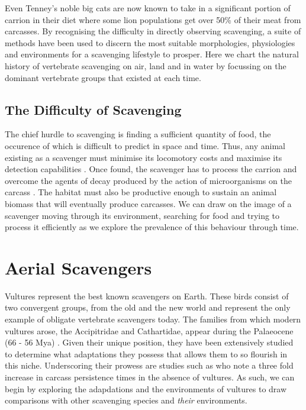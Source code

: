 \documentclass[a4paper,12pt]{article}
\begin{document}
Even Tenney’s noble big cats are now known to take in a significant portion of carrion in their diet where some lion populations get over 50\% of their meat from carcasses.
By recognising the difficulty in directly observing scavenging, a suite of methods have been used to discern the most suitable morphologies, physiologies and environments for a scavenging lifestyle to prosper.
Here we chart the natural history of vertebrate scavenging on air, land and in water by focussing on the dominant vertebrate groups that existed at each time.

\subsection*{The Difficulty of Scavenging} %
The chief hurdle to scavenging is finding a sufficient quantity of food, the occurence of which is difficult to predict in space and time. Thus, any animal existing as a scavenger must minimise its locomotory costs and maximise its detection capabilities \citep{ruxton2004obligate}.
Once found, the scavenger has to process the carrion and overcome the agents of decay produced by the action of microorganisms on the carcass \citep{ruxton2014fruit}. 
The habitat must also be productive enough to sustain an animal biomass that will eventually produce carcasses.
We can draw on the image of a scavenger moving through its environment, searching for food and trying to process it efficiently as we explore the prevalence of this behaviour through time. 



\section*{Aerial Scavengers}
Vultures represent the best known scavengers on Earth.
These birds consist of two convergent groups, from the old and the new world and represent the only example of obligate vertebrate scavengers today.
The families from which modern vultures arose, the Accipitridae and Cathartidae, appear during the Palaeocene (66 - 56 Mya) \citep{Jetz2012, Jarvis2014}.
Given their unique position, they have been extensively studied to determine what adaptations they possess that allows them to so flourish in this niche.
Underscoring their prowess are studies such as \cite{ogada2012effects} who note a three fold increase in carcass persistence times in the absence of vultures.
As such, we can begin by exploring the adapdations and the environments of vultures to draw comparisons with other scavenging species and \textit{their} environments.
\end{document}
